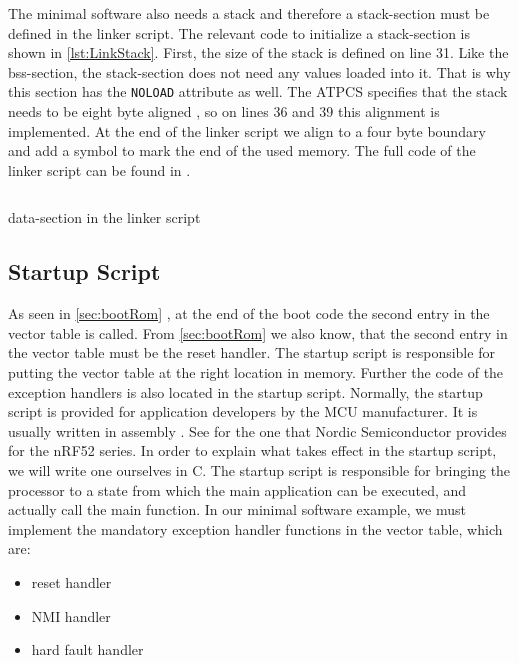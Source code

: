 \documentclass[a4paper,12pt]{article}
\newcommand{\secref}[1]{\autoref{#1} \nameref{#1}}
\newcommand{\inlinebash}[1]{\texttt{#1}}
\begin{document}
The minimal software also needs a stack and therefore a stack-section must be defined in the linker script. The relevant code to initialize a stack-section is shown in \autoref{lst:LinkStack}. First, the size of the stack is defined on line 31. Like the bss-section, the stack-section does not need any values loaded into it. That is why this section has the \inlinebash{NOLOAD} attribute as well. The \ac{ATPCS} specifies that the stack needs to be eight byte aligned \cite{ArmDevGuideAlignment}, so on lines 36 and 39 this alignment is implemented. At the end of the linker script we align to a four byte boundary and add a symbol to mark the end of the used memory. The full code of the linker script can be found in \cite{lorv_eva1}.

\begin{listing}
  \inputminted[firstline=31, lastline=45]{bash}{code/nrf52840_report_ld.ld}
  \caption{data-section in the linker script}
  \label{lst:LinkStack}
\end{listing}

\subsection{Startup Script}\label{sec:startupScipt}
As seen in \secref{sec:bootRom}, at the end of the boot code the second entry in the vector table is called. From \secref{sec:bootRom} we also know, that the second entry in the vector table must be the reset handler. The startup script is responsible for putting the vector table at the right location in memory. Further the code of the exception handlers is also located in the startup script. Normally, the startup script is provided for application developers by the \ac{MCU} manufacturer. It is usually written in assembly \cite{Interrupt}. See \cite{nrfxDriverCollection} for the one that Nordic Semiconductor provides for the nRF52 series. In order to explain what takes effect in the startup script, we will write one ourselves in C. The startup script is responsible for bringing the processor to a state from which the main application can be executed, and actually call the main function. In our minimal software example, we must implement the mandatory exception handler functions in the vector table, which are:

\begin{itemize}
  \item reset handler
  \item NMI handler
  \item hard fault handler
\end{itemize}
\end{document}
